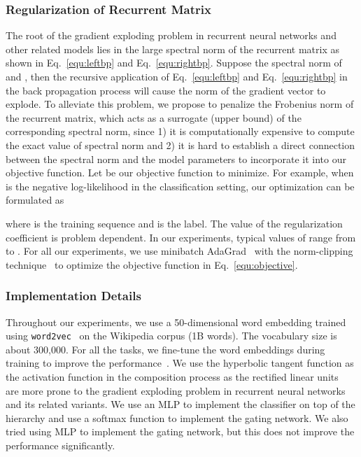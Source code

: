 \documentclass{article}
\theoremstyle{definition}
\begin{document}
\subsubsection{Regularization of Recurrent Matrix}
The root of the gradient exploding problem in recurrent neural networks and other related models lies in the large spectral norm of the recurrent matrix as shown in Eq.~\ref{equ:leftbp} and Eq.~\ref{equ:rightbp}. Suppose the spectral norm of  and  , then the recursive application of Eq.~\ref{equ:leftbp} and Eq.~\ref{equ:rightbp} in the back propagation process will cause the norm of the gradient vector to explode. To alleviate this problem, we propose to penalize the Frobenius norm of the recurrent matrix, which acts as a surrogate (upper bound) of the corresponding spectral norm, since 1) it is computationally expensive to compute the exact value of spectral norm and 2) it is hard to establish a direct connection between the spectral norm and the model parameters to incorporate it into our objective function. Let  be our objective function to minimize. For example, when  is the negative log-likelihood in the classification setting, our optimization can be formulated as

where  is the training sequence and  is the label. The value of the regularization coefficient  is problem dependent.  In our experiments, typical values of  range from  to . For all our experiments, we use minibatch AdaGrad~\cite{duchi2011adaptive} with the norm-clipping technique~\cite{pascanu2013difficulty} to optimize the objective function in Eq.~\ref{equ:objective}.

\subsubsection{Implementation Details}
Throughout our experiments, we use a 50-dimensional word embedding trained using \texttt{word2vec}~\cite{mikolov2013distributed} on the Wikipedia corpus (1B words). The vocabulary size is about 300,000. For all the tasks, we fine-tune the word embeddings during training to improve the performance~\cite{collobert2011natural}. We use the hyperbolic tangent function as the activation function in the composition process as the rectified linear units~\cite{nair2010rectified} are more prone to the gradient exploding problem in recurrent neural networks and its related variants. We use an MLP to implement the classifier on top of the hierarchy and use a softmax function to implement the gating network. We also tried using MLP to implement the gating network, but this does not improve the performance significantly.
\end{document}
